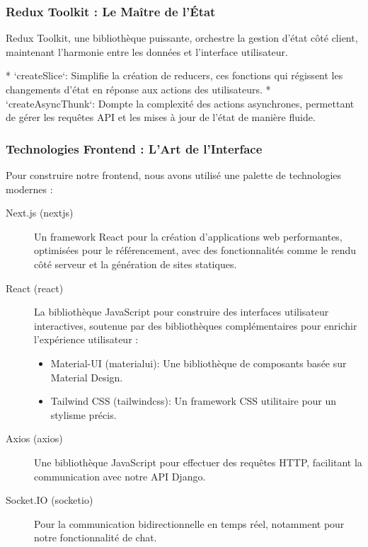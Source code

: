 \subsubsection{Redux Toolkit :  Le Maître de l'État}

Redux Toolkit, une bibliothèque puissante, orchestre la gestion d'état côté client, maintenant l'harmonie entre les données et l'interface utilisateur.

* `createSlice`:  Simplifie la création de reducers, ces fonctions qui régissent les changements d'état en réponse aux actions des utilisateurs.
* `createAsyncThunk`:  Dompte la complexité des actions asynchrones, permettant de gérer les requêtes API et les mises à jour de l'état de manière fluide.

\subsubsection{Technologies Frontend : L'Art de l'Interface}

Pour construire notre frontend, nous avons utilisé une palette de technologies modernes :

\begin{description}
    \item[Next.js (\gls{nextjs})] Un framework React pour la création d'applications web performantes, optimisées pour le référencement, avec des fonctionnalités comme le rendu côté serveur et la génération de sites statiques.
    \item[React (\gls{react})] La bibliothèque JavaScript pour construire des interfaces utilisateur interactives, soutenue par des bibliothèques complémentaires pour enrichir l'expérience utilisateur :
    \begin{itemize}
        \item Material-UI (\gls{materialui}): Une bibliothèque de composants basée sur Material Design.
        \item Tailwind CSS (\gls{tailwindcss}): Un framework CSS utilitaire pour un stylisme précis.
    \end{itemize}
    \item[Axios (\gls{axios})] Une bibliothèque JavaScript pour effectuer des requêtes HTTP, facilitant la communication avec notre API Django.
    \item[Socket.IO (\gls{socketio})] Pour la communication bidirectionnelle en temps réel, notamment pour notre fonctionnalité de chat.
\end{description}

